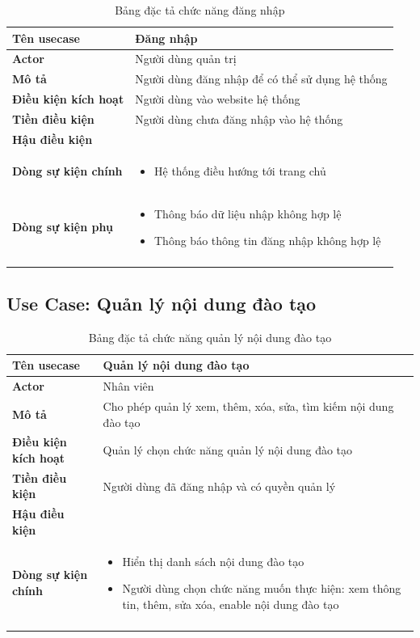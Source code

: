\documentclass[report.tex]{subfiles}
\begin{document}
\begin{table}[!ht]
\begin{longtable}{|p{4cm}|p{12cm}|}
\hline
\textbf{Tên usecase} & \textbf{Đăng nhập} \\
\hline
\textbf{Actor} & Người dùng quản trị \\
\hline
\textbf{Mô tả} & Người dùng đăng nhập để có thể sử dụng hệ thống \\
\hline
\textbf{Điều kiện kích hoạt} & Người dùng vào website hệ thống \\
\hline
\textbf{Tiền điều kiện} & Người dùng chưa đăng nhập vào hệ thống \\
\hline
\textbf{Hậu điều kiện} & \\
\hline
\textbf{Dòng sự kiện chính} &
\begin{itemize}[noitemsep]
  \item Hệ thống điều hướng tới trang chủ
\end{itemize}\\

\hline
\textbf{Dòng sự kiện phụ} & 
\begin{itemize}[noitemsep]
  \item Thông báo dữ liệu nhập không hợp lệ
  \item Thông báo thông tin đăng nhập không hợp lệ
\end{itemize}\\
\hline
\caption{Bảng đặc tả chức năng đăng nhập}
\end{longtable}
\end{table}
\FloatBarrier


\subsection{Use Case: Quản lý nội dung đào tạo}

\pagebreak

\begin{table}[!ht]
\begin{longtable}{|p{4cm}|p{12cm}|}
\hline
\textbf{Tên usecase} & \textbf{Quản lý nội dung đào tạo} \\
\hline
\textbf{Actor} & Nhân viên\\
\hline
\textbf{Mô tả} & Cho phép quản lý xem, thêm, xóa, sửa, tìm kiếm nội dung đào tạo \\
\hline
\textbf{Điều kiện kích hoạt} & Quản lý chọn chức năng quản lý nội dung đào tạo \\
\hline
\textbf{Tiền điều kiện} & Người dùng đã đăng nhập và có quyền quản lý \\
\hline
\textbf{Hậu điều kiện} & \\
\hline
\textbf{Dòng sự kiện chính} &
\begin{itemize}[noitemsep]
  \item Hiển thị danh sách nội dung đào tạo
  \item Người dùng chọn chức năng muốn thực hiện: xem thông tin, thêm, sửa xóa, enable nội dung đào tạo
\end{itemize}\\
\hline
\caption{Bảng đặc tả chức năng quản lý nội dung đào tạo}
\end{longtable}
\end{table}
\end{document}
